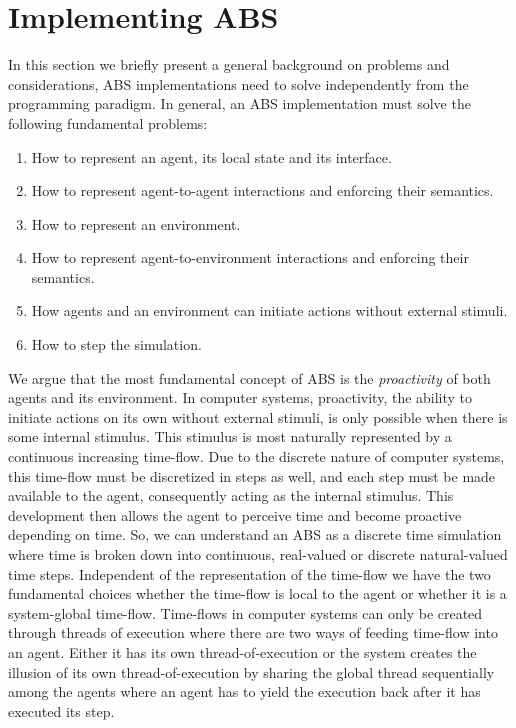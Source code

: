 \section{Implementing ABS}
\label{ch:impl_abs}
In this section we briefly present a general background on problems and considerations, ABS implementations need to solve independently from the programming paradigm. In general, an ABS implementation must solve the following fundamental problems:

\begin{enumerate}
	\item How to represent an agent, its local state and its interface.
	\item How to represent agent-to-agent interactions and enforcing their semantics.
	\item How to represent an environment.
	\item How to represent agent-to-environment interactions and enforcing their semantics.
	\item How agents and an environment can initiate actions without external stimuli.
	\item How to step the simulation.
\end{enumerate}

We argue that the most fundamental concept of ABS is the \textit{proactivity} of both agents and its environment. In computer systems, proactivity, the ability to initiate actions on its own without external stimuli, is only possible when there is some internal stimulus. This stimulus is most naturally represented by a continuous increasing time-flow. Due to the discrete nature of computer systems, this time-flow must be discretized in steps as well, and each step must be made available to the agent, consequently acting as the internal stimulus. This development then allows the agent to perceive time and become proactive depending on time. So, we can understand an ABS as a discrete time simulation where time is broken down into continuous, real-valued or discrete natural-valued time steps. Independent of the representation of the time-flow we have the two fundamental choices whether the time-flow is local to the agent or whether it is a system-global time-flow. Time-flows in computer systems can only be created through threads of execution where there are two ways of feeding time-flow into an agent. Either it has its own thread-of-execution or the system creates the illusion of its own thread-of-execution by sharing the global thread sequentially among the agents where an agent has to yield the execution back after it has executed its step. %

